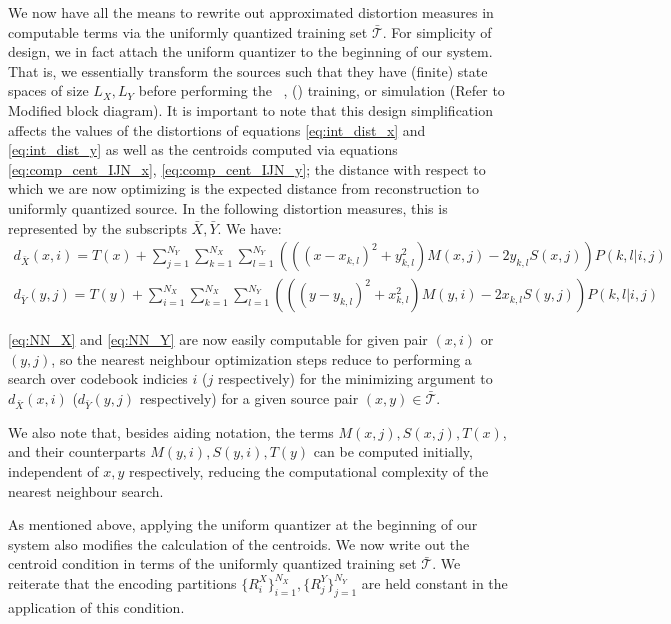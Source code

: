 We now have all the means to rewrite out approximated distortion measures in computable terms via the uniformly quantized training set $\mathcal{\bar T}$. For simplicity of design, we in fact attach the uniform quantizer to the beginning of our system. That is, we essentially transform the sources such that they have (finite) state spaces of size $L_X, L_Y$ before performing the \sysIJN\ , (\sysIJ) training, or simulation (Refer to Modified block diagram). It is important to note that this design simplification affects the values of the distortions of equations \eqref{eq:int_dist_x} and \eqref{eq:int_dist_y} as well as the centroids computed via equations \eqref{eq:comp_cent_IJN_x}, \eqref{eq:comp_cent_IJN_y}; the distance with respect to which we are now optimizing is the expected distance from reconstruction to uniformly quantized source. In the following distortion measures, this is represented by the subscripts $\bar X,\bar Y$. We have:
\begin{align}
    \label{eq:NN_X}
    d_{\bar X}(x,i) =
            T(x) + 
            \sum_{j=1}^{N_Y} \sum_{k=1}^{N_X} \sum_{l=1}^{N_Y}
            \left(\left({(x-x_{k,l})}^2 +
            y_{k,l}^2\right)M(x,j) -2y_{k,l}S(x,j)\right)P(k,l|i,j)\\
    \label{eq:NN_Y}
    d_{\bar Y}(y,j) =
            T(y) + 
            \sum_{i=1}^{N_X} \sum_{k=1}^{N_X} \sum_{l=1}^{N_Y}
            \left(\left({(y-y_{k,l})}^2 +
            x_{k,l}^2\right)M(y,i) -2x_{k,l}S(y,j)\right)P(k,l|i,j)
\end{align}

\eqref{eq:NN_X} and \eqref{eq:NN_Y} are now easily computable for given pair $(x, i)$ or $(y, j)$, so the nearest neighbour optimization steps reduce to performing a search over codebook indicies $i$ ($j$ respectively) for the minimizing argument to $d_{\bar X}(x,i)$ ($d_{\bar Y}(y,j)$ respectively) for a given source pair $(x,y)\in \mathcal{\bar T}$.

We also note that, besides aiding notation, the terms $M(x,j),S(x,j),T(x)$, and their counterparts $M(y,i),S(y,i),T(y)$ can be computed initially, independent of $x, y$ respectively, reducing the computational complexity of the nearest neighbour search.

As mentioned above, applying the uniform quantizer at the beginning of our system also modifies the calculation of the centroids. We now write out the centroid condition in terms of the uniformly quantized training set $\mathcal{\bar T}$. We reiterate that the encoding partitions $\{R_i^X\}_{i=1}^{N_X}, \{R_j^Y\}_{j=1}^{N_Y}$ are held constant in the application of this condition.

